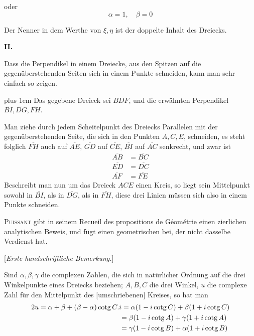 %
oder
\[
\alpha=1,\quad\beta=0
\]
\par
Der Nenner in dem Werthe von \(\xi,\eta\) ist der doppelte Inhalt des Dreiecks.

\par\medskip{}
\centerline{\textbf{II.}}\nobreak\smallskip
Dass die Perpendikel in einem Dreiecke, aus den Spitzen auf die gegenüberstehenden Seiten sich in einem Punkte schneiden, kann man sehr einfach so zeigen.

\begingroup\rightskip=0pt plus 1em
Das gegebene Dreieck sei \(BDF\), und die erwähnten Perpendikel \(\overline{BI},\overline{DG},\overline{FH}\).\par
\endgroup

Man ziehe durch jedem Scheitelpunkt des Dreiecks Parallelen mit der gegenüberstehenden Seite, die sich in den Punkten \(A,C,E\), schneiden, es steht folglich \(\overline{FH}\) auch auf \(\overline{AE}\), \(\overline{GD}\) auf \(\overline{CE}\), \(\overline{BI}\) auf \(\overline{AC}\) senkrecht, und zwar ist
\[
\begin{aligned}\overline{AB}&=\overline{BC}\\\overline{ED}&=\overline{DC}\\\overline{AF}&=\overline{FE}\end{aligned}
\]
Beschreibt man nun um das Dreieck \(ACE\) einen Kreis, so liegt sein Mittelpunkt sowohl in \(\overline{BI}\), als in \(\overline{DG}\), als in \(\overline{FH}\), diese drei Linien müssen sich also in einem Punkte schneiden.

\textsc{Puissant} gibt in seinem Recueil des propositions de Géométrie einen zierlichen analytischen Beweis, und fügt einen geometrischen bei, der nicht dasselbe Verdienst hat.

\par\medskip{}
\begin{center}[\textit{Erste handschriftliche Bemerkung.}]\end{center}
\hspace*{\parindent}Sind \(\alpha,\beta,\gamma\) die complexen Zahlen, die sich in natürlicher Ordnung auf die drei Winkelpunkte eines Dreiecks beziehen; \(A,B,C\) die drei Winkel, \(u\) die complexe Zahl für den Mittelpunkt des [umschriebenen] Kreises, so hat man
\[
\begin{aligned}
2u&=\alpha+\beta+(\beta-\alpha)\operatorname{cotg}C.i=\alpha(1-i\operatorname{cotg}C)+\beta(1+i\operatorname{cotg}C)\\
&\hphantom{=\alpha+\beta+(\beta-\alpha)\operatorname{cotg}C.i}=\beta(1-i\operatorname{cotg}A)+\gamma(1+i\operatorname{cotg}A)\\
&\hphantom{=\alpha+\beta+(\beta-\alpha)\operatorname{cotg}C.i}=\gamma(1-i\operatorname{cotg}B)+\alpha(1+i\operatorname{cotg}B)
\end{aligned}
\]
